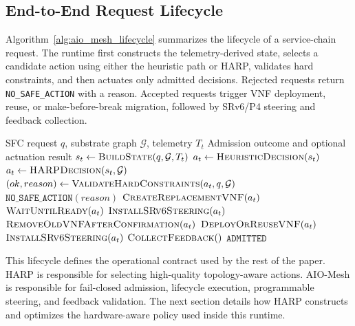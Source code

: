 \documentclass[final,5p]{elsarticle}
\begin{document}
\subsection{End-to-End Request Lifecycle}
\label{subsec:request_lifecycle}

Algorithm~\ref{alg:aio_mesh_lifecycle} summarizes the lifecycle of a service-chain request. The runtime first constructs the telemetry-derived state, selects a candidate action using either the heuristic path or HARP, validates hard constraints, and then actuates only admitted decisions. Rejected requests return \texttt{NO\_SAFE\_ACTION} with a reason. Accepted requests trigger VNF deployment, reuse, or make-before-break migration, followed by SRv6/P4 steering and feedback collection.

\begin{algorithm}[t]
\caption{AIO-Mesh request lifecycle}
\label{alg:aio_mesh_lifecycle}
\begin{algorithmic}[1]
\Require SFC request \(q\), substrate graph \(\mathcal{G}\), telemetry \(T_t\)
\Ensure Admission outcome and optional actuation result
\State \(s_t \gets \textsc{BuildState}(q,\mathcal{G},T_t)\)
    \State \(a_t \gets \textsc{HeuristicDecision}(s_t)\)
\Else
    \State \(a_t \gets \textsc{HARPDecision}(s_t,\mathcal{G})\)
\EndIf
\State \((ok, reason) \gets \textsc{ValidateHardConstraints}(a_t,q,\mathcal{G})\)
    \State \Return \(\texttt{NO\_SAFE\_ACTION}(reason)\)
\EndIf
{}
    \State \(\textsc{CreateReplacementVNF}(a_t)\)
    \State \(\textsc{WaitUntilReady}(a_t)\)
    \State \(\textsc{InstallSRv6Steering}(a_t)\)
    \State \(\textsc{RemoveOldVNFAfterConfirmation}(a_t)\)
\Else
    \State \(\textsc{DeployOrReuseVNF}(a_t)\)
    \State \(\textsc{InstallSRv6Steering}(a_t)\)
\EndIf
\State \(\textsc{CollectFeedback}()\)
\State \Return \(\texttt{ADMITTED}\)
\end{algorithmic}
\end{algorithm}

This lifecycle defines the operational contract used by the rest of the paper. HARP is responsible for selecting high-quality topology-aware actions. AIO-Mesh is responsible for fail-closed admission, lifecycle execution, programmable steering, and feedback validation. The next section details how HARP constructs and optimizes the hardware-aware policy used inside this runtime.
\end{document}
